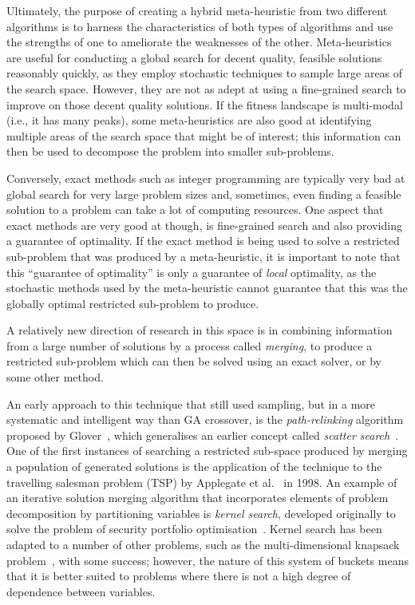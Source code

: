 \documentclass[journal]{IEEEtran}
\begin{document}
Ultimately, the purpose of creating a hybrid meta-heuristic from two different algorithms is to harness the characteristics of both types of algorithms and use the strengths of one to ameliorate the weaknesses of the other. Meta-heuristics are useful for conducting a global search for decent quality, feasible solutions reasonably quickly, as they employ stochastic techniques to sample large areas of the search space. However, they are not as adept at using a fine-grained search to improve on those decent quality solutions. If the fitness landscape is multi-modal (i.e., it has many peaks), some meta-heuristics are also good at identifying multiple areas of the search space that might be of interest; this information can then be used to decompose the problem into smaller sub-problems. 

Conversely, exact methods such as integer programming are typically very bad at global search for very large problem sizes and, sometimes, even finding a feasible solution to a problem can take a lot of computing resources. One aspect that exact methods are very good at though, is fine-grained search and also providing a guarantee of optimality. If the exact method is being used to solve a restricted sub-problem that was produced by a meta-heuristic, it is important to note that this ``guarantee of optimality'' is only a guarantee of \emph{local} optimality, as the stochastic methods used by the meta-heuristic cannot guarantee that this was the globally optimal restricted sub-problem to produce.

A relatively new direction of research in this space is in combining information from a large number of solutions by a process called \emph{merging}, to produce a restricted sub-problem which can then be solved using an exact solver, or by some other method. 

An early approach to this technique that still used sampling, but in a more systematic and intelligent way than GA crossover, is the \emph{path-relinking} algorithm proposed by Glover~\cite{path-relinking}, which generalises an earlier concept called \emph{scatter search}~\cite{scatter-search}. One of the first instances of searching a restricted sub-space produced by merging a population of generated solutions is the application of the technique to the travelling salesman problem (TSP) by Applegate et al.~\cite{merge-tsp} in 1998. An example of an iterative solution merging algorithm that incorporates elements of problem decomposition by partitioning variables is \emph{kernel search}, developed originally to solve the problem of security portfolio optimisation~\cite{kernel1}. Kernel search has been adapted to a number of other problems, such as the multi-dimensional knapsack problem~\cite{kernel2}, with some success; however, the nature of this system of buckets means that it is better suited to problems where there is not a high degree of dependence between variables.
\end{document}
